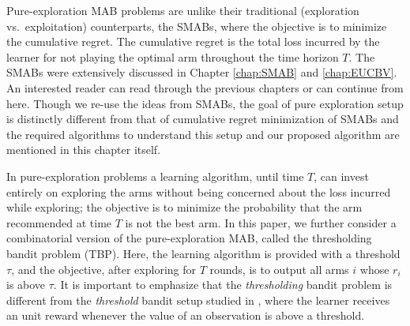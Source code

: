 
Pure-exploration MAB problems are unlike their traditional (exploration vs.\ exploitation)  counterparts, the SMABs, where the  objective is to minimize the cumulative regret. The cumulative regret is the total loss incurred by the learner for not playing the optimal arm throughout the time horizon $T$. The SMABs were extensively discussed in Chapter \ref{chap:SMAB} and \ref{chap:EUCBV}. An interested reader can read through the previous chapters or can continue from here. Though we re-use the ideas from SMABs, the goal of pure exploration setup is distinctly different from that of cumulative regret minimization of SMABs and the required algorithms to understand this setup and our proposed algorithm are mentioned in this chapter itself.

	In pure-exploration problems a learning algorithm, until time $T$, can invest entirely on exploring the arms without being concerned about the loss incurred while exploring; the objective is to minimize the probability that the arm recommended at time $T$ is not the best arm.  In this paper, we further consider a combinatorial version of the pure-exploration MAB, called the thresholding bandit problem (TBP).  Here, the learning algorithm is provided with a threshold $\tau$, and the objective, after exploring for $T$ rounds, is to  output all arms $i$ whose $r_{i}$ is above $\tau$. 
It is important to emphasize that the \emph{thresholding} bandit problem is different from the \emph{threshold} bandit setup studied in \cite{abernethy2016threshold}, where the learner receives an unit reward whenever the value of an observation is above a threshold. 

